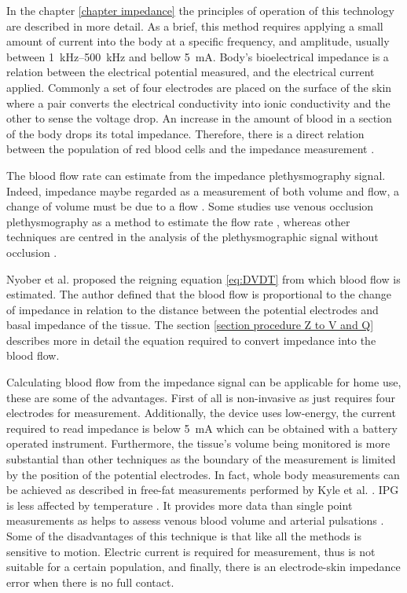 In the chapter \ref{chapter impedance} the principles of operation of this technology are described in more detail. As a brief, this method requires applying a small amount of current into the body at a specific frequency, and amplitude, usually between \SIrange{1}{500}{\kHz} \cite{kyle2004bioelectrical} and bellow \SI{5}{\mA}. Body's bioelectrical impedance is a relation between the electrical potential measured, and the electrical current applied. Commonly a set of four electrodes are placed on the surface of the skin where a pair converts the electrical conductivity into ionic conductivity and the other to sense the voltage drop. An increase in the amount of blood in a section of the body drops its total impedance. Therefore, there is a direct relation between the population of red blood cells and the impedance measurement \cite{mattern1957determination}. 

The blood flow rate can estimate from the impedance plethysmography signal. Indeed, impedance maybe regarded as a measurement of both volume and flow, a change of volume must be due to a flow \cite{martinsen2011bioimpedance}. Some studies use venous occlusion plethysmography as a method to estimate the flow rate \cite{mohapatra1979measurement, costeloe1980continuous, yamakoshi1980limb}, whereas other techniques are centred in the analysis of the plethysmographic signal without occlusion \cite{corciova2011peripheral, porter1985measurement, brown1975impedance, marks1985computer}. 

Nyober et al. \cite{nyober1950electrical} proposed the reigning equation \ref{eq:DVDT} from which blood flow is estimated. The author defined that the blood flow is proportional to the change of impedance in relation to the distance between the potential electrodes and basal impedance of the tissue. The section \ref{section procedure Z to V and Q} describes more in detail the equation required to convert impedance into the blood flow.

Calculating blood flow from the impedance signal can be applicable for home use, these are some of the advantages. First of all is non-invasive as just requires four electrodes for measurement. Additionally, the device uses low-energy, the current required to read impedance is below \SI{5}{\mA} which can be obtained with a battery operated instrument. Furthermore, the tissue's volume being monitored is more substantial than other techniques as the boundary of the measurement is limited by the position of the potential electrodes. In fact, whole body measurements can be achieved as described in free-fat measurements performed by Kyle et al. \cite{kyle2004bioelectrical}. IPG is less affected by temperature \cite{bera2014bioelectrical}. It provides more data than single point measurements as helps to assess venous blood volume and arterial pulsations \cite{bera2014bioelectrical}. Some of the disadvantages of this technique is that like all the methods is sensitive to motion. Electric current is required for measurement, thus is not suitable for a certain population, and finally, there is an electrode-skin impedance error when there is no full contact. 
 
